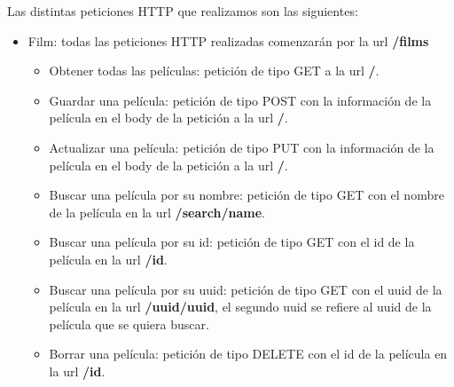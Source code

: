 Las distintas peticiones HTTP que realizamos son las siguientes:
\begin{itemize}
    \item Film: todas las peticiones HTTP realizadas comenzarán por la url \textbf{/films} 
    \begin{itemize}
        \item Obtener todas las películas: petición de tipo GET a la url \textbf{/}.
        \item Guardar una película: petición de tipo POST con la información de la película en el body de la petición a la url \textbf{/}.
        \item Actualizar una película: petición de tipo PUT con la información de la película en el body de la petición a la url \textbf{/}.
        \item Buscar una película por su nombre: petición de tipo GET con el nombre de la película en la url \textbf{/search/name}. 
        \item Buscar una película por su id: petición de tipo GET con el id de la película en la url \textbf{/id}.
        \item Buscar una película por su uuid: petición de tipo GET con el uuid de la película en la url \textbf{/uuid/uuid}, el segundo uuid se refiere al uuid de la película que se quiera buscar.
        \item Borrar una película: petición de tipo DELETE con el id de la película en la url \textbf{/id}.
    \end{itemize}
\end{itemize}

